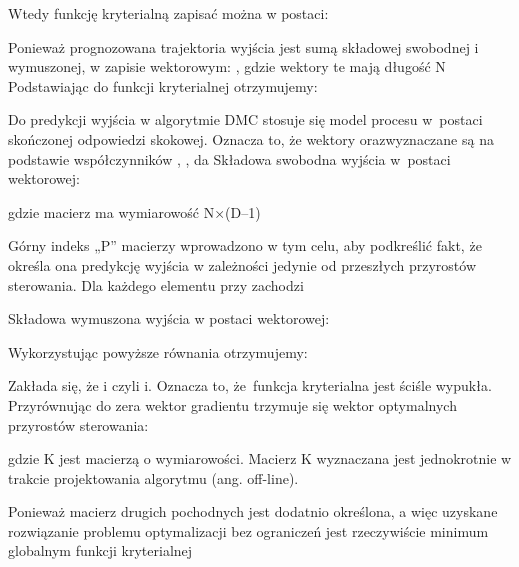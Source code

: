Wtedy funkcję kryterialną zapisać można w postaci:



Ponieważ prognozowana trajektoria wyjścia jest sumą składowej swobodnej i wymuszonej, w zapisie wektorowym:
, gdzie wektory te mają długość N
Podstawiając do funkcji kryterialnej otrzymujemy:



Do predykcji wyjścia w algorytmie DMC stosuje się model procesu w postaci skończonej odpowiedzi skokowej. Oznacza to, że wektory  orazwyznaczane są na podstawie współczynników { , , da  } Składowa swobodna wyjścia w postaci wektorowej:



gdzie macierz ma wymiarowość N×(D–1) 

Górny indeks „P” macierzy wprowadzono w tym celu, aby podkreślić fakt, że określa ona predykcję wyjścia w zależności jedynie od przeszłych przyrostów sterowania. Dla każdego elementu  przy  zachodzi  

Składowa wymuszona wyjścia w postaci wektorowej:


Wykorzystując powyższe równania otrzymujemy:


Zakłada się, że i  czyli i. Oznacza to, że funkcja kryterialna jest ściśle wypukła. Przyrównując do zera wektor gradientu trzymuje się wektor optymalnych przyrostów sterowania:



gdzie K jest macierzą o wymiarowości. Macierz K wyznaczana jest jednokrotnie w trakcie projektowania algorytmu (ang. off-line).



Ponieważ macierz drugich pochodnych jest dodatnio określona, a więc uzyskane rozwiązanie problemu optymalizacji bez ograniczeń jest rzeczywiście minimum globalnym funkcji kryterialnej 




